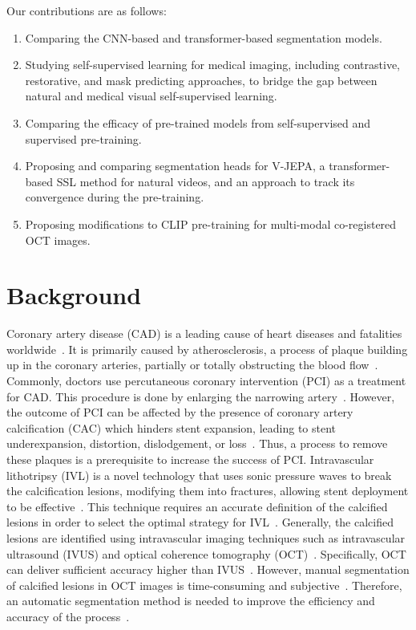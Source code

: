 \documentclass[a4paper,11pt,oneside]{report}
\begin{document}
Our contributions are as follows:
\begin{enumerate}
    \item Comparing the CNN-based and transformer-based segmentation models.
    \item Studying self-supervised learning for medical imaging, including contrastive, restorative, and mask predicting approaches, to bridge the gap between natural and medical visual self-supervised learning.
    \item Comparing the efficacy of pre-trained models from self-supervised and supervised pre-training.
    \item Proposing and comparing segmentation heads for V-JEPA, a transformer-based SSL method for natural videos, and an approach to track its convergence during the pre-training.
    \item Proposing modifications to CLIP pre-training for multi-modal co-registered OCT images.
\end{enumerate}

\chapter{Background}


Coronary artery disease (CAD) is a leading cause of heart diseases and fatalities worldwide~\cite{Virani2021Heart, Wu2015}. It is primarily caused by atherosclerosis, a process of plaque building up in the coronary arteries, partially or totally obstructing the blood flow~\cite{Shahjehan2023}. Commonly, doctors use percutaneous coronary intervention (PCI) as a treatment for CAD. This procedure is done by enlarging the narrowing artery~\cite{Ahmad2023}. However, the outcome of PCI can be affected by the presence of coronary artery calcification (CAC) which hinders stent expansion, leading to stent underexpansion, distortion, dislodgement, or loss~\cite{Hennessey2023}. Thus, a process to remove these plaques is a prerequisite to increase the success of PCI. Intravascular lithotripsy (IVL) is a novel technology that uses sonic pressure waves to break the calcification lesions, modifying them into fractures, allowing stent deployment to be effective~\cite{Butt2023}. This technique requires an accurate definition of the calcified lesions in order to select the optimal strategy for IVL~\cite{Butt2023}. Generally, the calcified lesions are identified using intravascular imaging techniques such as intravascular ultrasound (IVUS) and optical coherence tomography (OCT)~\cite{Butt2023}. Specifically, OCT can deliver sufficient accuracy higher than IVUS~\cite{Fujimoto2003, Costopoulos2016}. However, manual segmentation of calcified lesions in OCT images is time-consuming and subjective~\cite{Segars2013, Oktay2020, Carpenter2022}. Therefore, an automatic segmentation method is needed to improve the efficiency and accuracy of the process~\cite{Carpenter2022}.
\end{document}
